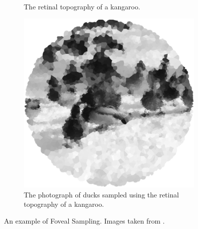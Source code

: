 \begin{figure}[h!]
\begin{subfigure}[t]{0.29\textwidth}
        \caption{The retinal topography of a kangaroo.}
    \end{subfigure} \hfill%
    \begin{subfigure}[t]{0.29\textwidth}
        \centering
        \captionsetup{justification=centering}
        \includegraphics[scale=0.2]{figures/fovealResult}
        \caption{The photograph of ducks sampled using the retinal topography of a kangaroo.}
    \end{subfigure}%
    \caption[Foveal Sampling]{An example of Foveal Sampling. Images taken from \cite{Foveal}.}
    \label{fig:foveal}
\end{figure}
